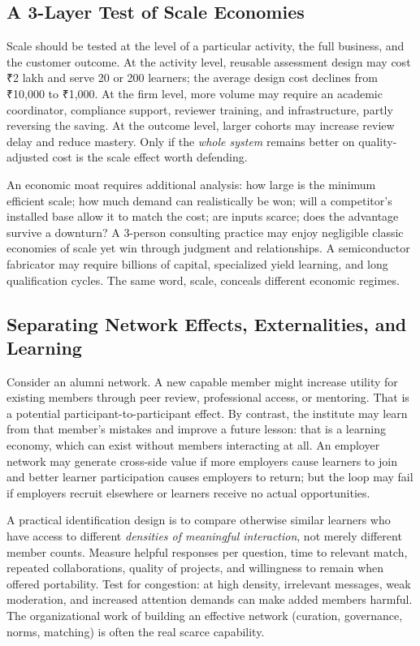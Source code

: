 \subsection{A 3-Layer Test of Scale Economies}
\label{sec:three_layer_test_scale_economies}

Scale should be tested at the level of a particular activity, the full business, and the customer outcome. At the activity level, reusable assessment design may cost ₹2 lakh and serve 20 or 200 learners; the average design cost declines from ₹10,000 to ₹1,000. At the firm level, more volume may require an academic coordinator, compliance support, reviewer training, and infrastructure, partly reversing the saving. At the outcome level, larger cohorts may increase review delay and reduce mastery. Only if the \textit{whole system} remains better on quality-adjusted cost is the scale effect worth defending.

An economic moat requires additional analysis: how large is the minimum efficient scale; how much demand can realistically be won; will a competitor's installed base allow it to match the cost; are inputs scarce; does the advantage survive a downturn? A 3-person consulting practice may enjoy negligible classic economies of scale yet win through judgment and relationships. A semiconductor fabricator may require billions of capital, specialized yield learning, and long qualification cycles. The same word, scale, conceals different economic regimes.

\subsection{Separating Network Effects, Externalities, and Learning}
\label{sec:separating_network_effects_externalities_learning}

Consider an alumni network. A new capable member might increase utility for existing members through peer review, professional access, or mentoring. That is a potential participant-to-participant effect. By contrast, the institute may learn from that member's mistakes and improve a future lesson: that is a learning economy, which can exist without members interacting at all. An employer network may generate cross-side value if more employers cause learners to join and better learner participation causes employers to return; but the loop may fail if employers recruit elsewhere or learners receive no actual opportunities.

A practical identification design is to compare otherwise similar learners who have access to different \textit{densities of meaningful interaction}, not merely different member counts. Measure helpful responses per question, time to relevant match, repeated collaborations, quality of projects, and willingness to remain when offered portability. Test for congestion: at high density, irrelevant messages, weak moderation, and increased attention demands can make added members harmful. The organizational work of building an effective network (curation, governance, norms, matching) is often the real scarce capability.

